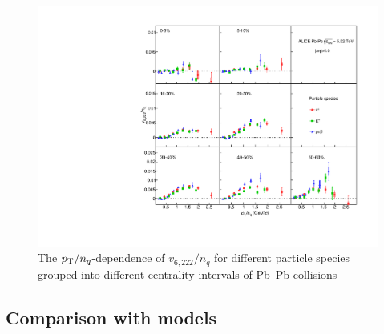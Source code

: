 \begin{figure}[!htb]
\begin{center}
\includegraphics[scale=0.82]{figures/scaling/All_v6222_gap00_NCQ_3by3.pdf}

\end{center}
\caption{The $p_{\rm{T}}/n_{q}$-dependence of $v_{6,222}/n_{q}$ for different particle species grouped into different centrality intervals of Pb--Pb collisions \sNN}
\label{v6222_NCQ}
\end{figure}

\newpage
\subsection{Comparison with models}
\label{SubSec:hydro}

